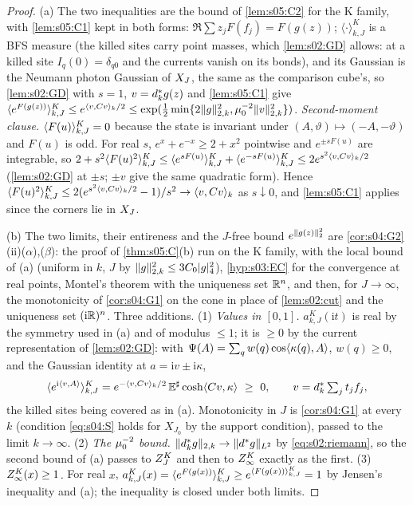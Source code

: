 \begin{proof}
(a) The two inequalities are the bound of \cref{lem:s05:C2} for the K family, with \cref{lem:s05:C1} kept in both forms: $\Re\sum z_jF(f_j)=F(g(z))$; $\langle\cdot\rangle^K_{k,J}$ is a BFS measure (the killed sites carry point masses, which \cref{lem:s02:GD} allows: at a killed site $I_q(0)=\delta_{q0}$ and the currents vanish on its bonds), and its Gaussian is the Neumann photon Gaussian of $X_J$, the same as the comparison cube's, so \cref{lem:s02:GD} with $s=1$, $v=d^{*}_kg(z)$ and \cref{lem:s05:C1} give $\langle e^{F(g(z))}\rangle^{K}_{k,J}\le e^{\langle v,Cv\rangle_k/2}\le\exp(\frac12\min\{2\lVert g\rVert^2_{2,k},\mu_0^{-2}\lVert v\rVert^2_{2,k}\})$. \emph{Second-moment clause.} $\langle F(u)\rangle^{K}_{k,J}=0$ because the state is invariant under $(A,\vartheta)\mapsto(-A,-\vartheta)$ and $F(u)$ is odd. For real $s$, $e^x+e^{-x}\ge2+x^2$ pointwise and $e^{\pm sF(u)}$ are integrable, so $2+s^2\langle F(u)^2\rangle^{K}_{k,J}\le\langle e^{sF(u)}\rangle^{K}_{k,J}+\langle e^{-sF(u)}\rangle^{K}_{k,J}\le2e^{s^2\langle v,Cv\rangle_k/2}$ (\cref{lem:s02:GD} at $\pm s$; $\pm v$ give the same quadratic form). Hence $\langle F(u)^2\rangle^{K}_{k,J}\le2(e^{s^2\langle v,Cv\rangle_k/2}-1)/s^2\to\langle v,Cv\rangle_k$ as $s\downarrow0$, and \cref{lem:s05:C1} applies since the corners lie in $X_J$.

(b) The two limits, their entireness and the $J$-free bound $e^{\lVert g(z)\rVert_2^2}$ are \cref{cor:s04:G2}(ii)($\alpha$),($\beta$): the proof of \cref{thm:s05:C}(b) run on the K family, with the local bound of (a) (uniform in $k$, $J$ by $\lVert g\rVert^2_{2,k}\le3C_0\lvert g\rvert_{4}^2$), \cref{hyp:s03:EC} for the convergence at real points, Montel's theorem with the uniqueness set $\mathbb R^n$, and then, for $J\to\infty$, the monotonicity of \cref{cor:s04:G1} on the cone in place of \cref{lem:s02:cut} and the uniqueness set $(\mathrm i\mathbb R)^n$. Three additions. (1) \emph{Values in $[0,1]$.} $a^K_{k,J}(\mathrm it)$ is real by the symmetry used in (a) and of modulus $\le1$; it is $\ge0$ by the current representation of \cref{lem:s02:GD}: with $\Psi(A)=\sum_qw(q)\cos\langle \kappa(q),A\rangle$, $w(q)\ge0$, and the Gaussian identity at $a=\mathrm iv\pm\mathrm i\kappa$,
\[
\langle e^{\mathrm i\langle v,A\rangle}\rangle^{K}_{k,J}=e^{-\langle v,Cv\rangle_k/2}\,\mathbb E^\sharp\cosh\langle Cv,\kappa\rangle\ \ge\ 0,\qquad v=d^{*}_k\textstyle\sum_jt_jf_j,
\]
the killed sites being covered as in (a). Monotonicity in $J$ is \cref{cor:s04:G1} at every $k$ (condition \eqref{eq:s04:S} holds for $X_{J_0}$ by the support condition), passed to the limit $k\to\infty$. (2) \emph{The $\mu_0^{-2}$ bound.} $\lVert d^{*}_kg\rVert_{2,k}\to\lVert d^{*} g\rVert_{L^2}$ by \eqref{eq:s02:riemann}, so the second bound of (a) passes to $Z^{K}_{J}$ and then to $Z^{K}_{\infty}$ exactly as the first. (3) \emph{$Z^{K}_{\infty}(x)\ge1$.} For real $x$, $a^K_{k,J}(x)=\langle e^{F(g(x))}\rangle^{K}_{k,J}\ge e^{\langle F(g(x))\rangle^{K}_{k,J}}=1$ by Jensen's inequality and (a); the inequality is closed under both limits.


\end{proof}

